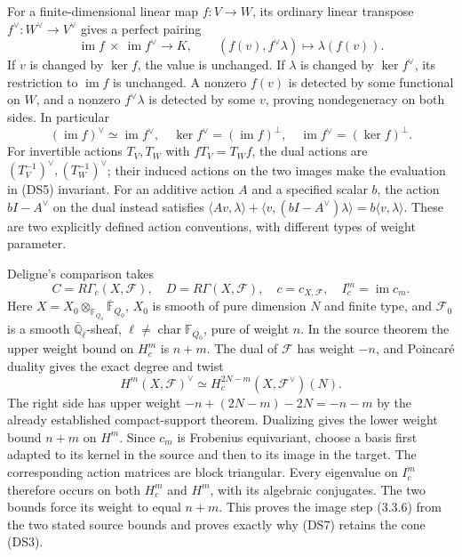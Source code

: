For a finite-dimensional linear map $f:V\to W$, its ordinary linear
transpose $f^\vee:W^\vee\to V^\vee$ gives a perfect pairing
\[
 \operatorname{im}f\ \times\ \operatorname{im}f^\vee\longrightarrow K,
 \qquad (f(v),f^\vee\lambda)\longmapsto\lambda(f(v)).
 \tag{DS5}
\]
If $v$ is changed by $\ker f$, the value is unchanged.  If $\lambda$
is changed by $\ker f^\vee$, its restriction to $\operatorname{im}f$
is unchanged.  A nonzero $f(v)$ is detected by some functional on $W$,
and a nonzero $f^\vee\lambda$ is detected by some $v$, proving
nondegeneracy on both sides.  In particular
\[
 (\operatorname{im}f)^\vee\simeq\operatorname{im}f^\vee,
 \quad \ker f^\vee=(\operatorname{im}f)^\perp,
 \quad \operatorname{im}f^\vee=(\ker f)^\perp.
 \tag{DS6}
\]
For invertible actions $T_V,T_W$ with $fT_V=T_Wf$, the dual actions
are $(T_V^{-1})^\vee,(T_W^{-1})^\vee$; their induced actions on
the two images make the evaluation in (DS5) invariant.  For an additive
action $A$ and a specified scalar $b$, the action $bI-A^\vee$ on the
dual instead satisfies
$\langle Av,\lambda\rangle+\langle v,(bI-A^\vee)\lambda\rangle
=b\langle v,\lambda\rangle$.  These are two explicitly defined
action conventions, with different types of weight parameter.

Deligne's comparison takes
\[
 C=R\Gamma_c(X,\mathcal F),\quad D=R\Gamma(X,\mathcal F),\quad
 c=c_{X,\mathcal F},\quad I_c^m=\operatorname{im}c_m.
 \tag{DS7}
\]
Here $X=X_0\otimes_{\mathbb F_{Q_0}}\overline{\mathbb F}_{Q_0}$,
$X_0$ is smooth of pure dimension $N$ and finite type, and
$\mathcal F_0$ is a smooth $\overline{\mathbb Q}_\ell$-sheaf,
$\ell\ne\operatorname{char}\mathbb F_{Q_0}$, pure of weight $n$.
In the source theorem the upper weight bound on $H_c^m$ is $n+m$.
The dual of $\mathcal F$ has weight $-n$, and Poincar\'e duality gives
the exact degree and twist
\[
 H^m(X,\mathcal F)^\vee
 \simeq H_c^{2N-m}(X,\mathcal F^\vee)(N).
 \tag{DS8}
\]
The right side has upper weight
$-n+(2N-m)-2N=-n-m$ by the already established compact-support
theorem.  Dualizing gives the lower weight bound $n+m$ on $H^m$.
Since $c_m$ is Frobenius equivariant, choose a basis first adapted to
its kernel in the source and then to its image in the target.
The corresponding action matrices are block triangular.  Every
eigenvalue on $I_c^m$ therefore occurs on both $H_c^m$ and $H^m$,
with its algebraic conjugates.  The two bounds force its weight to
equal $n+m$.  This proves the image step (3.3.6) from the two stated
source bounds and proves exactly why (DS7) retains the cone (DS3).

